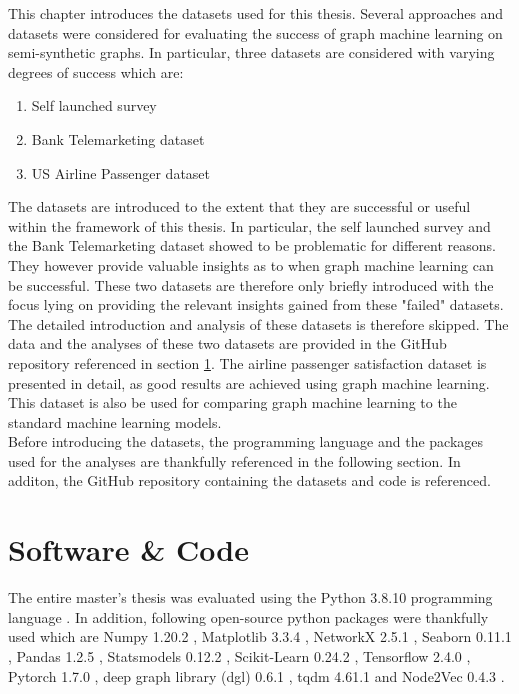   
  This chapter introduces the datasets used for this thesis. Several approaches
  and datasets were considered for evaluating the success of graph machine
  learning on semi-synthetic graphs. In particular, three datasets are 
  considered with varying degrees of success which are:

  \begin{enumerate}
    \item Self launched survey
    \item Bank Telemarketing dataset
    \item US Airline Passenger dataset
  \end{enumerate}

  \noindent The datasets are introduced to the extent that they are successful 
  or useful within the framework of this thesis. In particular, the self 
  launched survey and the Bank Telemarketing dataset showed to be problematic 
  for different reasons. They however provide valuable insights as to when 
  graph machine learning can be successful. These two datasets are therefore 
  only briefly introduced with the focus lying on providing the relevant 
  insights gained from these "failed" datasets. The detailed introduction and
  analysis of these datasets is therefore skipped. The data and the analyses of
  these two datasets are provided in the GitHub repository referenced in
  section \ref{section:software}. The airline passenger satisfaction dataset 
  is presented in detail, as good results are achieved using graph machine 
  learning. This dataset is also be used for comparing graph machine learning 
  to the standard machine learning models. \\

  \noindent Before introducing the datasets, the programming language and the
   packages used for the analyses are thankfully referenced in the following 
   section. In additon, the GitHub repository containing the datasets and code
   is referenced.

  \section{Software \& Code}
  \label{section:software}

  The entire master's thesis was evaluated using the Python 3.8.10 programming
  language \citep{vanRossum2009}. In addition, following open-source python
  packages were thankfully used which are Numpy 1.20.2 \citep{harris2020array},
  Matplotlib 3.3.4 \citep{Hunter2007}, NetworkX 2.5.1 \citep{hagberg2008exploring}, 
  Seaborn 0.11.1 \citep{Waskom2021}, Pandas 1.2.5 \citep{mckinney2010data}, 
  Statsmodels 0.12.2 \citep{seabold2010statsmodels}, Scikit-Learn 0.24.2 
  \citep{pedregosa2011scikit}, Tensorflow 2.4.0 \citep{abadi2016tensorflow}, 
  Pytorch 1.7.0 \citep{paszke2019pytorch}, deep graph library (dgl) 0.6.1 
  \citep{wang2019deep}, tqdm 4.61.1 \citep{da2021tqdm} and Node2Vec 0.4.3 
  \citep{Cohen2021}. \\

